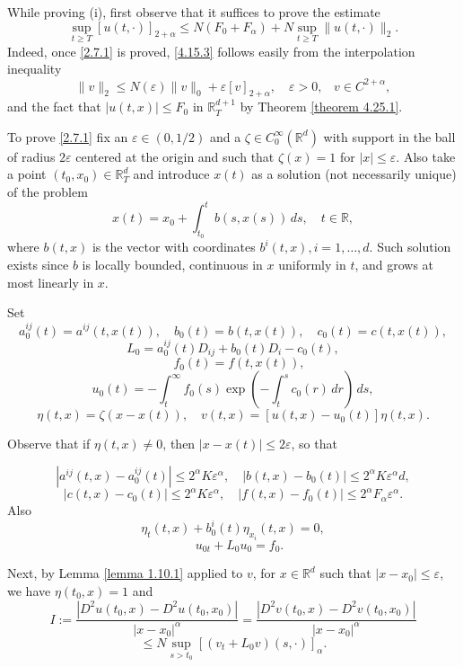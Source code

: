 \documentclass[reqno,12pt]{amsart}
\theoremstyle{definition}
\theoremstyle{remark}
\begin{document}
   While proving (i), first observe that it suffices to prove the
estimate
\begin{equation}
                                                          \label{2.7.1}
\sup_{t\ge  T}[u(t,\cdot)]_{2+\alpha}\leq N  (F_{0}+F_{\alpha})
+N\sup_{t\ge  T}\|u(t,\cdot)\|_{2}.
\end{equation}
   Indeed, once \eqref{2.7.1} is proved,
\eqref{4.15.3} follows easily from the interpolation inequality
$$
\|v\|_{2}\leq N(\varepsilon)\|v\|_{0}+\varepsilon[v]_{2+\alpha},
\quad \varepsilon>0, \;\;\; v \in C^{2+ \alpha} ,
$$
   and the fact  that $|u(t,x)| \leq F_{0}$
   in ${\mathbb{R}}^{d+1}_{T}$ by
Theorem \ref{theorem 4.25.1}.

To prove \eqref{2.7.1} fix an $\varepsilon\in(0,1/2)$ and a
$\zeta\in C^{\infty}_{0}({\mathbb{R}}^{d})$ with support in the ball of
radius $2\varepsilon$ centered at the origin and such that
$\zeta(x)=1$ for $|x|\leq\varepsilon$. Also take  a point
$(t_{0},x_{0})\in{\mathbb{R}}^{d}_{T}$ and introduce $x(t)$ as a  solution (not
necessarily unique) of the problem
$$
x(t)=x_{0}+\int_{t_{0}}^{t}b(s,x(s))\,ds,\quad t \in{\mathbb{R}},
$$
where $b(t,x)$ is the vector with coordinates $b^{i}(t,x),i=1,
\ldots, d $.   Such solution exists since $b$ is locally bounded,
continuous in $x$ uniformly in $t$, and grows at most linearly in
$x$.

Set
$$
a_{0}^{ij}(t)=a^{ij}(t,x(t)),\quad b_{0}(t)=b(t,x(t)) ,\quad
c_{0}(t)=c(t,x(t)),
$$
$$
L_{0}=a_{0}^{ij}(t)D_{ij}+b_{0}(t)D_{i}-c_{0}(t), $$ $$ \quad
f_{0}(t)=f(t,x(t)),
$$
$$
u_{0}(t)=-\int_{t}^{\infty}f_{0}(s) \exp(-\int_{t}^{s }c_{0}(
r)\,dr)\,ds,
$$
$$
\eta(t,x)=\zeta(x-x(t)), \quad v(t,x)=[u(t,x) -u_{0}(t)]\eta(t,x)
.
$$

Observe that if   $\eta(t,x)\ne0$, then
$|x-x(t)|\leq2\varepsilon$, so that

$$
|a^{ij}(t,x)-a_{0}^{ij}(t)|\leq2^{\alpha}K\varepsilon^{\alpha},
\quad |b(t,x)-b_{0}(t)|\leq2^{\alpha}K\varepsilon^{\alpha}d,
$$
\begin{equation}
                                            \label{1.20.1}
|c(t,x)-c_{0}(t)|\leq2^{\alpha}K\varepsilon^{\alpha}, \quad
|f(t,x)-f_{0}(t)|\leq2^{\alpha}F_{\alpha}\varepsilon^{\alpha}.
\end{equation}
Also
$$
\eta_{t}(t,x)+b^{i}_{0}(t)\eta_{x_{i}}(t,x)=0, $$ $$ \quad
u_{0t}+L_{0}u_{0}= f_{0}.
$$

Next, by Lemma \ref{lemma 1.10.1} applied to
 $v$,  for   $x \in {\mathbb{R}}^d $ such that
 $
|x-x_{0}|\leq\varepsilon 
 $,
we have $\eta(t_{0},x)=1$ and
$$
I:=\frac{|D^2u(t_{0},x)- D^2u (t_{0},x_{0})|}{|x-x_{0}|^{\alpha}}=
\frac{|D^2v(t_{0},x)- D^2v (t_{0},x_{0})|}{|x-x_{0}|^{\alpha}}
$$
$$
 \leq
N\sup_{s>t_{0}} [(v_{t}+L_{0}v)(s,\cdot)]_{\alpha}.
$$
\end{document}
